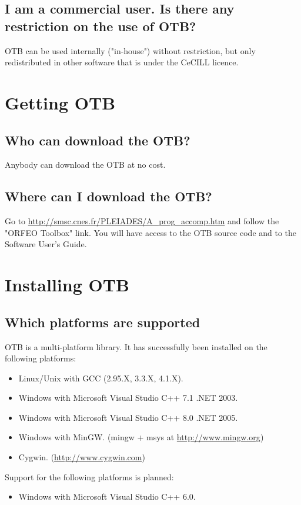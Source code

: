 \subsection{I am a commercial user. Is there any restriction on the
  use of OTB?}
OTB can be used internally ("in-house") without restriction, but only
redistributed in other software that is under the CeCILL licence.

\section{Getting OTB}
\subsection{Who can download the OTB?}
Anybody can download the OTB at no cost. 
\subsection{Where can I download the OTB?}
Go to \url{http://smsc.cnes.fr/PLEIADES/A_prog_accomp.htm}
 and follow the "ORFEO Toolbox" link. You will have access to the OTB
source code and to the Software User's Guide.
\section{Installing OTB}
\label{sec:FAQInstall}
\subsection{Which platforms are supported}
OTB is a multi-platform library. It has successfully been installed on
the following platforms:
\begin{itemize}
  \item Linux/Unix with GCC (2.95.X, 3.3.X, 4.1.X).
  \item Windows with Microsoft Visual Studio C++ 7.1 .NET 2003.
  \item Windows with Microsoft Visual Studio C++ 8.0 .NET 2005.  
  \item Windows with MinGW. (mingw + msys at \url{http://www.mingw.org})
  \item Cygwin. (\url{http://www.cygwin.com})
\end{itemize}

Support for the following platforms is planned:
\begin{itemize}
  \item Windows with Microsoft Visual Studio C++ 6.0.
\end{itemize}

